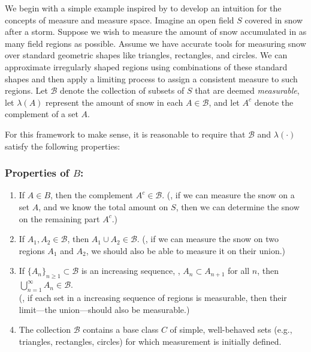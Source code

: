 We begin with a simple example inspired by \cite{athreyaMeasureTheoryProbability2006} to develop an intuition for the concepts of measure and measure space.
Imagine an open field $S$ covered in snow after a storm. Suppose we wish to measure the amount of snow accumulated in as many field regions as possible.
Assume we have accurate tools for measuring snow over standard geometric shapes like triangles, rectangles, and circles. 
We can approximate irregularly shaped regions using combinations of these standard shapes and then apply a limiting process to assign a consistent measure to such regions. 
Let $\mathcal{B}$ denote the collection of subsets of $S$ that are deemed \emph{measurable}, let $\lambda(A)$ represent the amount of snow in each $A \in \mathcal{B}$, and let $A^c$ denote the complement of a set $A$.


For this framework to make sense, it is reasonable to require that $ \mathcal{B}$ and $\lambda (\cdot)$ satisfy the following properties:

\subsubsection*{Properties of $B$:}
\begin{enumerate}
    \item If $A \in B$, then the complement $A^c \in \mathcal{B}$. (\ie, if we can measure the snow on a set $A$, and we know the total amount on $S$, then we can determine the snow on the remaining part $A^c$.)
    \item If $A_1, A_2 \in \mathcal{B}$, then \(A_1 \cup A_2 \in \mathcal{B}\).  
    (\ie, if we can measure the snow on two regions \(A_1\) and \(A_2\), we should also be able to measure it on their union.)
    \item If $\{A_n\}_{n \geq 1} \subset \mathcal{B}$ is an increasing sequence, \ie, $A_n \subset A_{n+1}$ for all $n$, then $\bigcup_{n=1}^{\infty} A_n \in \mathcal{B}$.  
    \\(\ie, if each set in a increasing sequence of regions is measurable, then their limit—the union—should also be measurable.)
    \item The collection $\mathcal{B}$ contains a base class $C$ of simple, well-behaved sets (e.g., triangles, rectangles, circles) for which measurement is initially defined.
\end{enumerate}

